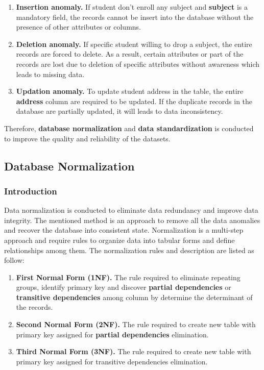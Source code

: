 \begin{enumerate}[topsep=0pt,itemsep=-1ex,partopsep=1ex,parsep=1.5ex]
	
	\item \textbf{Insertion anomaly.} If student don't enroll any subject and \textbf{subject} is a mandatory field, the records cannot be insert into the database without the presence of other attributes or columns. 
	\item \textbf{Deletion anomaly.} If specific student willing to drop a subject, the entire records are forced to delete. As a result, certain attributes or part of the records are lost due to deletion of specific attributes without awareness which leads to missing data.
	\item \textbf{Updation anomaly.} To update student address in the table, the entire \textbf{address} column are required to be updated. If the duplicate records in the database are partially updated, it will leads to data inconsistency. 
	
\end{enumerate}

Therefore, \textbf{database normalization} and \textbf{data standardization} is conducted to improve the quality and reliability of the datasets.

\subsection{Database Normalization}

\subsubsection{Introduction}

Data normalization is conducted to eliminate data redundancy and improve data integrity. The mentioned method is an approach to remove all the data anomalies and recover the database into consistent state. \cite{normalization-benefits} Normalization is a multi-step approach and require rules to organize data into tabular forms and define relationships among them. The normalization rules and description are listed as follow: 

\begin{enumerate}[topsep=0pt,itemsep=-1ex,partopsep=1ex,parsep=1.5ex]
	
	\item \textbf{First Normal Form (1NF).} The rule required to eliminate repeating groups, identify primary key and discover \textbf{partial dependencies} or \textbf{transitive dependencies} among column by determine the determinant of the records. 
	\item \textbf{Second Normal Form (2NF).} The rule required to create new table with primary key assigned for \textbf{partial dependencies} elimination. 
	\item \textbf{Third Normal Form (3NF).} The rule required to create new table with primary key assigned for transitive dependencies elimination. 
	
\end{enumerate}

